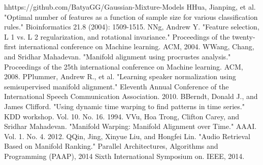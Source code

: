 \documentclass[paper=a4, fontsize=11pt, DIV=13]{scrartcl}
\begin{document}
\begin{thebibliography}{99}

\bibitem[1] hhttps://github.com/BatyaGG/Gaussian-Mixture-Models
\bibitem[2] HHua, Jianping, et al. "Optimal number of features as a function of sample size for various classification rules." Bioinformatics 21.8 (2004): 1509-1515.
\bibitem[3] NNg, Andrew Y. "Feature selection, L 1 vs. L 2 regularization, and rotational invariance." Proceedings of the twenty-first international conference on Machine learning. ACM, 2004.
\bibitem[4] WWang, Chang, and Sridhar Mahadevan. "Manifold alignment using procrustes analysis." Proceedings of the 25th international conference on Machine learning. ACM, 2008.
\bibitem[5] PPlummer, Andrew R., et al. "Learning speaker normalization using semisupervised manifold alignment." Eleventh Annual Conference of the International Speech Communication Association. 2010.
\bibitem[6] BBerndt, Donald J., and James Clifford. "Using dynamic time warping to find patterns in time series." KDD workshop. Vol. 10. No. 16. 1994.
\bibitem[7] VVu, Hoa Trong, Clifton Carey, and Sridhar Mahadevan. "Manifold Warping: Manifold Alignment over Time." AAAI. Vol. 1. No. 4. 2012.
\bibitem[8] QQin, Jing, Xinyue Liu, and Hongfei Lin. "Audio Retrieval Based on Manifold Ranking." Parallel Architectures, Algorithms and Programming (PAAP), 2014 Sixth International Symposium on. IEEE, 2014.

\end{thebibliography}
\end{document}
